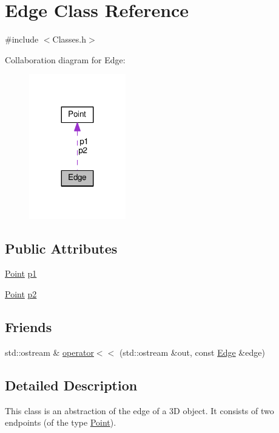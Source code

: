 \hypertarget{class_edge}{}\section{Edge Class Reference}
\label{class_edge}


{\ttfamily \#include $<$Classes.\+h$>$}



Collaboration diagram for Edge\+:\nopagebreak
\begin{figure}[H]
\begin{center}
\leavevmode
\includegraphics[width=119pt]{class_edge__coll__graph}
\end{center}
\end{figure}
\subsection*{Public Attributes}
\begin{DoxyCompactItemize}
\item 
\hyperlink{class_point}{Point} \hyperlink{class_edge_a9cb958550d6ca42fd7122235d64898c9}{p1}
\item 
\hyperlink{class_point}{Point} \hyperlink{class_edge_a0867d7b428491ef61eb90b540a73db1d}{p2}
\end{DoxyCompactItemize}
\subsection*{Friends}
\begin{DoxyCompactItemize}
\item 
std\+::ostream \& \hyperlink{class_edge_ac72878b9f65eaae932db47be729c3087}{operator$<$$<$} (std\+::ostream \&out, const \hyperlink{class_edge}{Edge} \&edge)
\end{DoxyCompactItemize}


\subsection{Detailed Description}
This class is an abstraction of the edge of a 3D object. It consists of two endpoints (of the type \hyperlink{class_point}{Point}). 

